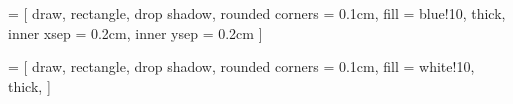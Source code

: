 
 =
[
      draw,
      rectangle,
      drop shadow,
      rounded corners   = 0.1cm,
      fill              = blue!10,
      thick,
      inner xsep        = 0.2cm,          %
      inner ysep        = 0.2cm                 %
]

 =
[
      draw,
      rectangle,
      drop shadow,
      rounded corners   = 0.1cm,
      fill              = white!10,
      thick,
]

